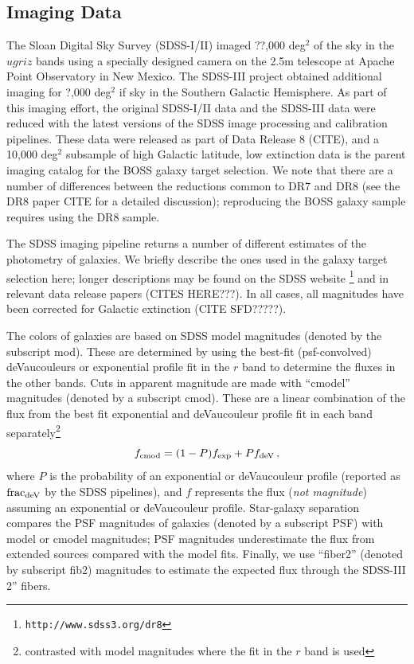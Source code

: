 \documentclass[preprint]{aastex}
\begin{document}
\subsection{Imaging Data}

The Sloan Digital Sky Survey (SDSS-I/II) imaged ??,000 deg$^2$ of the sky in 
the $ugriz$ bands using a specially designed camera on the 2.5m telescope at 
Apache Point Observatory in New Mexico. The SDSS-III project obtained additional
imaging for ?,000 deg$^2$ if sky in the Southern Galactic Hemisphere. As part
of this imaging effort, the original SDSS-I/II data and the SDSS-III data were
reduced with the latest versions of the SDSS image processing and calibration
pipelines. These data were released as part of Data Release 8 (CITE), and
a 10,000 deg$^2$ subsample of high Galactic latitude, low extinction data is 
the parent imaging catalog for the BOSS galaxy target selection. We note that
there are a number of differences between the reductions common to DR7 and DR8
(see the DR8 paper CITE for a detailed discussion); reproducing the BOSS galaxy
sample requires using the DR8 sample. 

The SDSS imaging pipeline returns a number of different estimates of the
photometry of galaxies. We briefly describe the ones used in the galaxy target
selection here; longer descriptions may be found on the SDSS website
\footnote{\texttt{http://www.sdss3.org/dr8}} and in relevant data release papers
(CITES HERE???). In all cases, all magnitudes have been corrected for Galactic
extinction (CITE SFD?????). 

The colors of galaxies are based on SDSS model magnitudes (denoted by the
subscript mod). These are determined by using the best-fit (psf-convolved)
deVaucouleurs or exponential profile fit in the $r$ band to determine the fluxes
in the other bands. Cuts in apparent magnitude are made with ``cmodel''
magnitudes (denoted by a subscript cmod). These are a linear combination of the
flux from the best fit exponential and deVaucouleur profile fit in each band
separately\footnote{contrasted with model magnitudes where the fit in the $r$
band is used} 
\begin{equation}
f_{\rm cmod} = (1 - P) f_{\rm exp} + P f_{\rm deV} \, , 
\end{equation}
where $P$ is the probability of an exponential or deVaucouleur profile
(reported as ${\rm frac}_{\rm deV}$ by the SDSS pipelines), and $f$ represents
the flux ({\it not magnitude}) assuming an exponential or deVaucouleur profile. 
Star-galaxy separation compares the PSF magnitudes of galaxies (denoted by a
subscript PSF) with model or cmodel magnitudes; PSF magnitudes underestimate the 
flux from extended sources compared with the model fits. Finally, we use 
``fiber2'' (denoted by subscript fib2) magnitudes to estimate the expected flux
through the SDSS-III 2'' fibers. 
\end{document}
